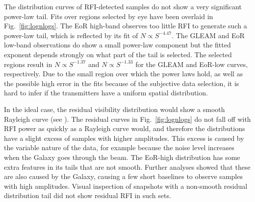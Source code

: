 \documentclass{pasa}
\begin{document}
The distribution curves of RFI-detected samples do not show a very significant power-law tail. Fits over regions selected by eye have been overlaid in Fig.~\ref{fig:lognlogs}. The EoR high-band observes too little RFI to generate such a power-law tail, which is reflected by its fit of $N\propto S^{-4.47}$. The GLEAM and EoR low-band observations do show a small power-law component but the fitted exponent depends strongly on what part of the tail is selected. The selected regions result in $N\propto S^{-1.37}$ and $N\propto S^{-1.33}$ for the GLEAM and EoR-low curves, respectively. Due to the small region over which the power laws hold, as well as the possible high error in the fits because of the subjective data selection, it is hard to infer if the transmitters have a uniform spatial distribution.

In the ideal case, the residual visibility distribution would show a smooth Rayleigh curve (see \citealt{offringa-rfi-distributions}). The residual curves in Fig.~\ref{fig:lognlogs} do not fall off with RFI power as quickly as a Rayleigh curve would, and therefore the distributions have a slight excess of samples with higher amplitudes. This excess is caused by the variable nature of the data, for example because the noise level increases when the Galaxy goes through the beam. The EoR-high distribution has some extra features in its tails that are not smooth. Further analyses showed that these are also caused by the Galaxy, causing a few short baselines to observe samples with high amplitudes. Visual inspection of snapshots with a non-smooth residual distribution tail did not show residual RFI in such sets.
\end{document}
